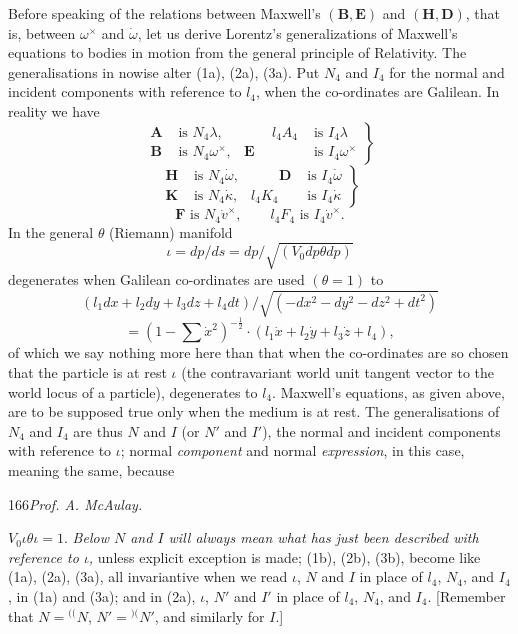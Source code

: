 \documentclass[11pt]{article}
\newcommand{\markpair}[3]{{}^{#1#2}#3}
\begin{document}
\indent Before speaking of the relations between Maxwell's $(\mathbf{B},\mathbf{E})$ and $(\mathbf{H},\mathbf{D})$, that is, between $\omega^\times$ and $\dot\omega$, let us derive Lorentz's generalizations of Maxwell's equations to bodies in motion from the general principle of Relativity. The generalisations in nowise alter (1a), (2a), (3a). Put $N_4$ and $I_4$ for the normal and incident components with reference to $l_4$, when the co-ordinates are Galilean. In reality we have
\begin{equation}
  \left.\begin{aligned}
    \mathbf{A}&\text{ is }N_4\lambda, &\qquad l_4A_4&\text{ is }I_4\lambda\\
    \mathbf{B}&\text{ is }N_4\omega^\times, & \mathbf{E}&\text{ is }I_4\omega^\times
  \end{aligned}\right\}
  \tag{1b}
\end{equation}
\begin{equation}
  \left.\begin{aligned}
    \mathbf{H}&\text{ is }N_4\dot\omega, &\qquad \mathbf{D}&\text{ is }I_4\dot\omega\\
    \mathbf{K}&\text{ is }N_4\dot\kappa, & l_4K_4&\text{ is }I_4\dot\kappa
  \end{aligned}\right\}
  \tag{2b}
\end{equation}
\begin{equation}
  \mathbf{F}\text{ is }N_4\dot v^\times,\qquad l_4F_4\text{ is }I_4\dot v^\times.
  \tag{3b}
\end{equation}
In the general $\theta$ (Riemann) manifold
\[
  \iota=dp/ds=dp/\sqrt{(V_0dp\theta dp)}
\]
degenerates when Galilean co-ordinates are used $(\theta=1)$ to
\[
  (l_1dx+l_2dy+l_3dz+l_4dt)/\sqrt{(-dx^2-dy^2-dz^2+dt^2)}
\]
\[
  =(1-\sum\dot x^2)^{-\frac12}\cdot(l_1\dot x+l_2\dot y+l_3\dot z+l_4),
\]
of which we say nothing more here than that when the co-ordinates are so chosen that the particle is at rest $\iota$ (the contravariant world unit tangent vector to the world locus of a particle), degenerates to $l_4$. Maxwell's equations, as given above, are to be supposed true only when the medium is at rest. The generalisations of $N_4$ and $I_4$ are thus $N$ and $I$ (or $N'$ and $I'$), the normal and incident components with reference to $\iota$; normal \emph{component} and normal \emph{expression}, in this case, meaning the same, because

\newpage\thispagestyle{empty}\begin{center}166\hfill \textit{Prof. A. McAulay.}\end{center}
$V_0\iota\theta\iota=1$. \emph{Below $N$ and $I$ will always mean what has just been described with reference to $\iota$,} unless explicit exception is made; (1b), (2b), (3b), become like (1a), (2a), (3a), all invariantive when we read $\iota$, $N$ and $I$ in place of $l_4$, $N_4$, and $I_4$, in (1a) and (3a); and in (2a), $\iota$, $N'$ and $I'$ in place of $l_4$, $N_4$, and $I_4$. [Remember that $N=\markpair{(}{(}{N}$, $N'=\markpair{)}{(}{N'}$, and similarly for $I$.]
\end{document}
